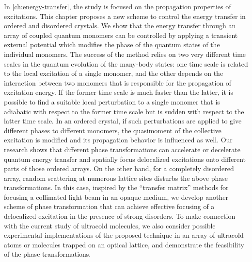 In \autoref{ch:energy-transfer}, 
the study is focused on the propagation properties of excitations. This chapter proposes a new scheme to control the 
energy transfer in ordered and disordered crystals. 
We 
show that the energy transfer through an array of coupled quantum monomers can be controlled by applying a 
transient external potential which modifies the phase of the quantum states of the individual monomers. The success of the method relies 
on two very different time scales in the quantum evolution of the many-body states: one time scale is related to the 
local excitation of a single monomer, and the other depends on the interaction between two monomers that is responsible
for the propagation of excitation energy. If the former time scale is much faster than the latter, it is possible to find a suitable
local perturbation to a single monomer that is adiabatic with respect to the former time scale but is sudden
with respect to the latter time scale.  In an ordered crystal, if such perturbations are applied to give different phases to 
different monomers, the quasimoment of the collective excitation is modified and its propagation behavior is influenced
as well. Our research shows that different phase transformations can accelerate or decelerate quantum energy transfer and 
spatially focus delocalized excitations onto different parts of those ordered arrays. On the other hand, for a completely disordered array,  random scattering at numerous lattice sites disturbs the above phase transformations. In this case,  inspired by the ``transfer matrix'' methods for focusing  a 
collimated light beam in an opaque medium\cite{opaque-1, Gigan-TMeasure-PRL10, Mosk-NPhot10, Cizmar-NPhot10, 
Silberberg-11, Chatel-Focusing-11, Lagendijk-Focusing-11, zhenia-11, cui-11, kim-11},
we develop another scheme of phase transformation that 
can achieve effective focusing of a delocalized excitation in the presence of strong disorders. To make connection with the current study of  
ultracold molecules,  we also consider possible experimental implementations of the proposed technique in an array of 
ultracold atoms or molecules trapped on an optical lattice, and demonstrate the feasibility of the phase transformations. 


